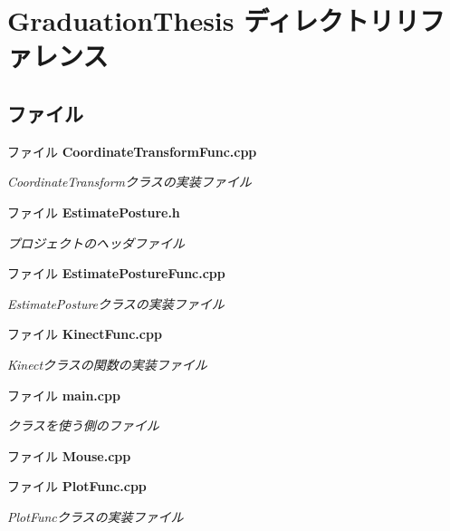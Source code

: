 \section{Graduation\-Thesis ディレクトリリファレンス}
\label{dir_71aff1b741e829ed185286e598576fcf}
\subsection*{ファイル}
\begin{DoxyCompactItemize}
\item 
ファイル {\bf Coordinate\-Transform\-Func.\-cpp}
\begin{DoxyCompactList}\small\item\em Coordinate\-Transformクラスの実装ファイル \end{DoxyCompactList}\item 
ファイル {\bf Estimate\-Posture.\-h}
\begin{DoxyCompactList}\small\item\em プロジェクトのヘッダファイル \end{DoxyCompactList}\item 
ファイル {\bf Estimate\-Posture\-Func.\-cpp}
\begin{DoxyCompactList}\small\item\em Estimate\-Postureクラスの実装ファイル \end{DoxyCompactList}\item 
ファイル {\bf Kinect\-Func.\-cpp}
\begin{DoxyCompactList}\small\item\em Kinectクラスの関数の実装ファイル \end{DoxyCompactList}\item 
ファイル {\bf main.\-cpp}
\begin{DoxyCompactList}\small\item\em クラスを使う側のファイル \end{DoxyCompactList}\item 
ファイル {\bf Mouse.\-cpp}
\item 
ファイル {\bf Plot\-Func.\-cpp}
\begin{DoxyCompactList}\small\item\em Plot\-Funcクラスの実装ファイル \end{DoxyCompactList}\end{DoxyCompactItemize}
